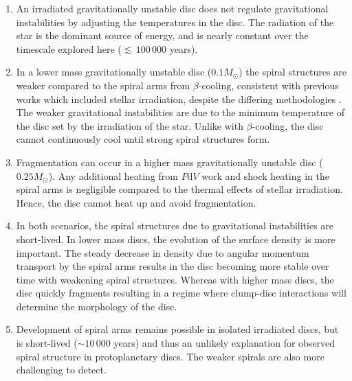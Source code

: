 \documentclass[usenatbib]{mnras}
\begin{document}
\begin{enumerate}
    \item An irradiated gravitationally unstable disc does not regulate gravitational instabilities by adjusting the temperatures in the disc. The radiation of the star is the dominant source of energy, and is nearly constant over the timescale explored here (${\lesssim}\,100\,000$ years).
    \item In a lower mass gravitationally unstable disc ($0.1M_\odot$) the spiral structures are weaker compared to the spiral arms from {$\beta\text{-cooling}$}, consistent with previous works which included stellar irradiation, despite the differing methodologies \citep{2008Cai,2010Meru,2013aForgan}. The weaker gravitational instabilities are due to the minimum temperature of the disc set by the irradiation of the star. Unlike with $\beta$-cooling, the disc cannot continuously cool until strong spiral structures form.
    \item Fragmentation can occur in a higher mass gravitationally unstable disc ($0.25M_\odot$). Any additional heating from $P\mathrm{d}V$ work and shock heating in the spiral arms is negligible compared to the thermal effects of stellar irradiation. Hence, the disc cannot heat up and avoid fragmentation.
    \item In both scenarios, the spiral structures due to gravitational instabilities are short-lived. In lower mass discs, the evolution of the surface density is more important. The steady decrease in density due to angular momentum transport by the spiral arms results in the disc becoming more stable over time with weakening spiral structures. Whereas with higher mass discs, the disc quickly fragments resulting in a regime where clump-disc interactions will determine the morphology of the disc.
    \item Development of spiral arms remains possible in isolated irradiated discs, but is short-lived (${\sim}10\,000$ years) and thus an unlikely explanation for observed spiral structure in protoplanetary discs. The weaker spirals are also more challenging to detect.
\end{enumerate}
\end{document}
